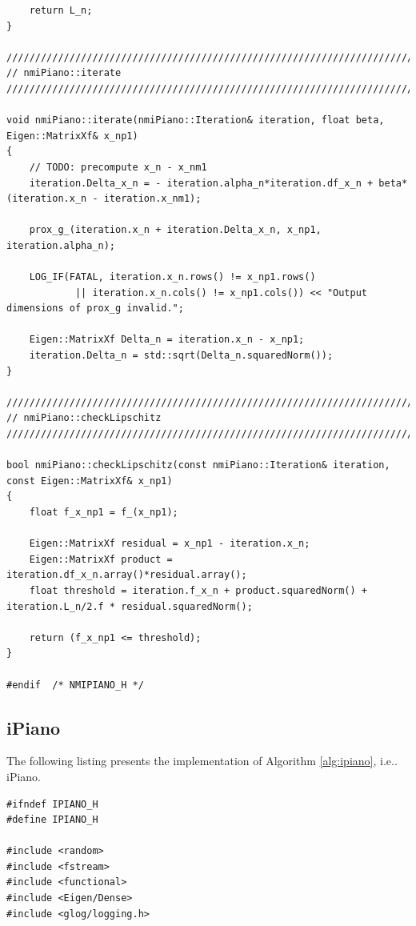 \documentclass[onecolumn,final,a4paper,13pt,reqno]{siamart}
\makeatletter
\DeclareRobustCommand\onedot{\futurelet\@let@token\@onedot}
\def\@onedot{\ifx\@let@token.\else.\null\fi\xspace}
\def\ie{{i.e}\onedot} \def\Ie{{I.e}\onedot}
\makeatother
\begin{document}
\begin{appendix}
\begin{lstlisting}
    return L_n;
}

////////////////////////////////////////////////////////////////////////////////
// nmiPiano::iterate
////////////////////////////////////////////////////////////////////////////////

void nmiPiano::iterate(nmiPiano::Iteration& iteration, float beta, Eigen::MatrixXf& x_np1)
{
    // TODO: precompute x_n - x_nm1
    iteration.Delta_x_n = - iteration.alpha_n*iteration.df_x_n + beta*(iteration.x_n - iteration.x_nm1);
    
    prox_g_(iteration.x_n + iteration.Delta_x_n, x_np1, iteration.alpha_n);
    
    LOG_IF(FATAL, iteration.x_n.rows() != x_np1.rows() 
            || iteration.x_n.cols() != x_np1.cols()) << "Output dimensions of prox_g invalid.";
    
    Eigen::MatrixXf Delta_n = iteration.x_n - x_np1;
    iteration.Delta_n = std::sqrt(Delta_n.squaredNorm());
}

////////////////////////////////////////////////////////////////////////////////
// nmiPiano::checkLipschitz
////////////////////////////////////////////////////////////////////////////////

bool nmiPiano::checkLipschitz(const nmiPiano::Iteration& iteration, const Eigen::MatrixXf& x_np1)
{
    float f_x_np1 = f_(x_np1);
    
    Eigen::MatrixXf residual = x_np1 - iteration.x_n;
    Eigen::MatrixXf product = iteration.df_x_n.array()*residual.array();
    float threshold = iteration.f_x_n + product.squaredNorm() + iteration.L_n/2.f * residual.squaredNorm();
    
    return (f_x_np1 <= threshold);
}

#endif	/* NMIPIANO_H */
	\end{lstlisting}
	
	\subsection{iPiano}
	
	The following listing presents the implementation of Algorithm \ref{alg:ipiano}, \ie iPiano.
	
	\vspace{-0.3cm}
	\begin{lstlisting}
#ifndef IPIANO_H
#define	IPIANO_H

#include <random>
#include <fstream>
#include <functional>
#include <Eigen/Dense>
#include <glog/logging.h>


\end{lstlisting}
\end{appendix}
\end{document}
